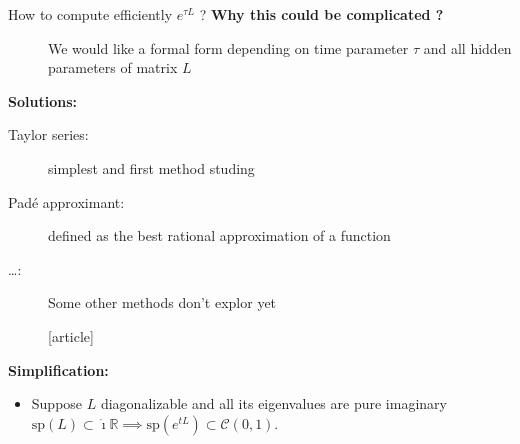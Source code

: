 \documentclass{beamer}
\newcommand{\xmark}{{\color{red}\ding{55}}}
\newcommand{\mbold}[1]{{\textbf{\color{PLB}#1}}}
\newcommand{\I}{\dot{\imath}}
\newcommand{\customcite}[1]{\cite{#1}}
\begin{document}
\begin{frame}{How to compute efficiently $e^{\tau L}$ ?}
  \mbold{Why this could be complicated ?}
  \begin{description}
    \item[\xmark] We would like a formal form depending on time parameter $\tau$ and all hidden parameters of matrix $L$
  \end{description}

  \mbold{Solutions:}
  \begin{description}
    \item[Taylor series:] simplest and first method studing
    \item[Padé approximant:] defined as the best rational approximation of a function
    \item[\dots:] Some other methods don't explor yet
      \vspace{-0.1cm}
      \begin{thebibliography}{9}
        [article]
         \customcite{Moler:2003}
      \end{thebibliography}
  \end{description}

  \mbold{Simplification:}
  \begin{itemize}
    \item Suppose $L$ diagonalizable and all its eigenvalues are pure imaginary $\text{sp}(L)\subset\I\mathbb{R}\implies \text{sp}(e^{tL})\subset\mathcal{C}(0,1)$.
  \end{itemize}
\end{frame}
\end{document}
